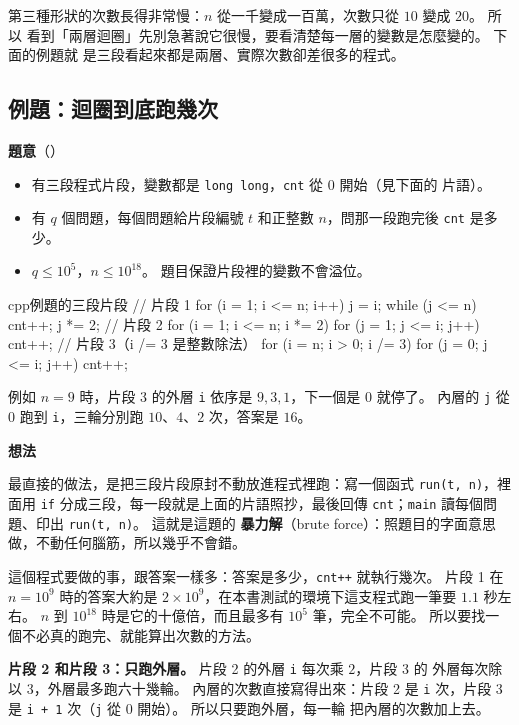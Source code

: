 第三種形狀的次數長得非常慢：$n$ 從一千變成一百萬，次數只從 $10$ 變成 $20$。 所以
看到「兩層迴圈」先別急著說它很慢，要看清楚每一層的變數是怎麼變的。 下面的例題就
是三段看起來都是兩層、實際次數卻差很多的程式。

\subsection{例題：迴圈到底跑幾次}
\label{sec:ex-loop-count}

\textbf{題意}（）

\begin{itemize}
\item 有三段程式片段，變數都是 \texttt{long long}，\texttt{cnt} 從 $0$ 開始（見下面的
片語）。
\item 有 $q$ 個問題，每個問題給片段編號 $t$ 和正整數 $n$，問那一段跑完後
\texttt{cnt} 是多少。
\item $q \le 10^5$，$n \le 10^{18}$。 題目保證片段裡的變數不會溢位。
\end{itemize}

\begin{code}[label=code:three-pieces]{cpp}{例題的三段片段}
// 片段 1
for (i = 1; i <= n; i++) {
    j = i;
    while (j <= n) {
        cnt++;
        j *= 2;
    }
}
// 片段 2
for (i = 1; i <= n; i *= 2)
    for (j = 1; j <= i; j++)
        cnt++;
// 片段 3（i /= 3 是整數除法）
for (i = n; i > 0; i /= 3)
    for (j = 0; j <= i; j++)
        cnt++;
\end{code}

例如 $n = 9$ 時，片段 3 的外層 \texttt{i} 依序是 $9, 3, 1$，下一個是 $0$ 就停了。
內層的 \texttt{j} 從 $0$ 跑到 \texttt{i}，三輪分別跑 $10$、$4$、$2$ 次，答案是
$16$。

\textbf{想法}

最直接的做法，是把三段片段原封不動放進程式裡跑：寫一個函式
\texttt{run(t, n)}，裡面用 \texttt{if} 分成三段，每一段就是上面的片語照抄，最後回傳
\texttt{cnt}；\texttt{main} 讀每個問題、印出 \texttt{run(t, n)}。 這就是這題的
\textbf{暴力解}（brute force）：照題目的字面意思做，不動任何腦筋，所以幾乎不會錯。

這個程式要做的事，跟答案一樣多：答案是多少，\texttt{cnt++} 就執行幾次。 片段 1
在 $n = 10^9$ 時的答案大約是 $2 \times 10^9$，在本書測試的環境下這支程式跑一筆要
$1.1$ 秒左右。 $n$ 到 $10^{18}$ 時是它的十億倍，而且最多有 $10^5$ 筆，完全不可能。
所以要找一個不必真的跑完、就能算出次數的方法。

\textbf{片段 2 和片段 3：只跑外層。} 片段 2 的外層 \texttt{i} 每次乘 $2$，片段 3 的
外層每次除以 $3$，外層最多跑六十幾輪。 內層的次數直接寫得出來：片段 2 是 \texttt{i}
次，片段 3 是 \texttt{i + 1} 次（\texttt{j} 從 $0$ 開始）。 所以只要跑外層，每一輪
把內層的次數加上去。

